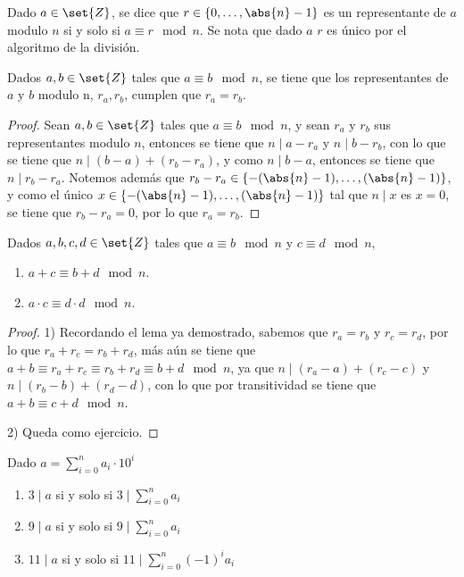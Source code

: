 \documentclass{ayudantia}
\begin{document}
\begin{defn}
    Dado \(a\in\set{Z}\), se dice que \(r\in\{0,\dots,\abs{n}-1\}\) es un representante de \(a\) modulo \(n\) si y solo si \(a\equiv r\mod n\). Se nota que dado \(a\) \(r\) es único por el algoritmo de la división.
\end{defn}

\begin{lem}
    Dados \(a,b\in\set{Z}\) tales que \(a\equiv b\mod n\), se tiene que los representantes de \(a\) y \(b\) modulo n, \(r_a,r_b\), cumplen que \(r_a=r_b\).
\end{lem}
\begin{proof}
    Sean \(a,b\in\set{Z}\) tales que \(a\equiv b\mod n\), y sean \(r_a\) y \(r_b\) sus representantes modulo \(n\), entonces se tiene que \(n\mid a-r_a\) y \(n\mid b-r_b\), con lo que se tiene que \(n\mid (b-a)+(r_b-r_a)\), y como \(n\mid b-a\), entonces se tiene que \(n\mid r_b-r_a\). Notemos además que \(r_b-r_a\in\{-(\abs{n}-1),\dots,(\abs{n}-1)\}\), y como el único \(x\in\{-(\abs{n}-1),\dots,(\abs{n}-1)\}\) tal que \(n\mid x\) es \(x=0\), se tiene que \(r_b-r_a=0\), por lo que \(r_a=r_b\).
\end{proof}

\begin{thm}
    Dados \(a,b,c,d\in\set{Z}\) tales que \(a\equiv b\mod n\) y \(c\equiv d\mod n\), 
    \begin{enumerate}
        \item \(a+c\equiv b+d\mod n\).
        \item \(a\cdot c\equiv d\cdot d\mod n\).
    \end{enumerate}
\end{thm}

\begin{proof}
    1) Recordando el lema ya demostrado, sabemos que \(r_a=r_b\) y \(r_c=r_d\), por lo que \(r_a+r_c=r_b+r_d\), más aún se tiene que \(a+b\equiv r_a+r_c\equiv r_b+r_d\equiv b+d\mod n\), ya que \(n\mid (r_a-a)+(r_c-c)\) y \(n\mid (r_b-b)+(r_d-d)\), con lo que por transitividad se tiene que \(a+b\equiv c+d\mod n\).

    2) Queda como ejercicio.
\end{proof}

\begin{thm}
    Dado \(a=\sum_{i=0}^na_i\cdot 10^i\)
    \begin{enumerate}
        \item \(3\mid a\) si y solo si \(3\mid\sum_{i=0}^na_i\)
        \item \(9\mid a\) si y solo si \(9\mid\sum_{i=0}^na_i\)
        \item \(11\mid a\) si y solo si \(11\mid\sum_{i=0}^n(-1)^ia_i\)
    \end{enumerate}
\end{thm}
\end{document}
